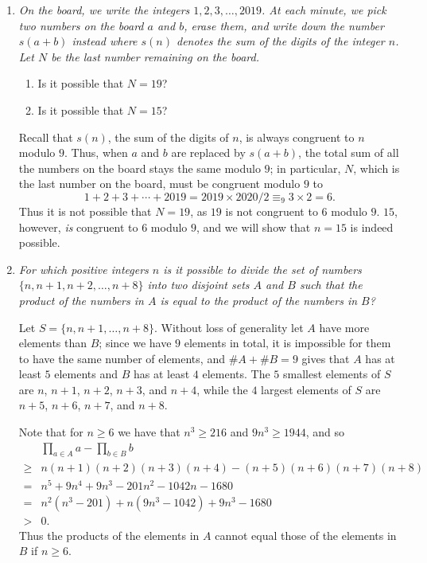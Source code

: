 \documentclass{article}
\begin{document}
\begin{enumerate}

\medskip
\item %
{\itshape On the board, we write the integers $1, 2, 3, \dots, 2019$.
At each minute, we pick two numbers on the board $a$ and $b$, erase them, and write down the number $s(a + b)$ instead where $s(n)$ denotes the sum of the digits of the integer $n$.
Let $N$ be the last number remaining on the board.
\begin{enumerate}
	\item Is it possible that $N = 19$?
	\item Is it possible that $N = 15$?
\end{enumerate}}

Recall that $s(n)$, the sum of the digits of $n$, is always congruent to $n$ modulo $9$.
Thus, when $a$ and $b$ are replaced by $s(a+b)$, the total sum of all the numbers on the board stays the same modulo $9$; in particular, $N$, which is the last number on the board, must be congruent modulo $9$ to
\[ 1 +2 +3 +\dotsb +2019 = 2019 \times 2020 / 2 \equiv_9 3 \times 2 = 6. \]
Thus it is not possible that $N = 19$, as $19$ is not congruent to $6$ modulo $9$.
$15$, however, \emph{is} congruent to $6$ modulo $9$, and we will show that $n = 15$ is indeed possible.



\medskip
\item %
{\itshape For which positive integers $n$ is it possible to divide the set of numbers $\{n, n+1, n+2, \dotsc, n+8\}$ into two disjoint sets $A$ and $B$ such that the product of the numbers in $A$ is equal to the product of the numbers in $B$?}

Let $S = \{n, n+1, \dotsc, n+8\}$.
Without loss of generality let $A$ have more elements than $B$; since we have $9$ elements in total, it is impossible for them to have the same number of elements, and $\#A +\#B = 9$ gives that $A$ has at least $5$ elements and $B$ has at least $4$ elements.
The $5$ smallest elements of $S$ are $n$, $n+1$, $n+2$, $n+3$, and $n+4$, while the $4$ largest elements of $S$ are $n+5$, $n+6$, $n+7$, and $n+8$.

Note that for $n \geq 6$ we have that $n^3 \geq 216$ and $9n^3 \geq 1944$, and so
\begin{align*}
	& \prod_{a \in A} a -\prod_{b \in B} b \\
	\geq & n(n+1)(n+2)(n+3)(n+4) - (n+5)(n+6)(n+7)(n+8) \\
	= & n^5 +9n^4 +9n^3 -201n^2 -1042n -1680 \\
	= & n^2(n^3-201) +n(9n^3-1042) +9n^3-1680 \\
	> & 0.
\end{align*}
Thus the products of the elements in $A$ cannot equal those of the elements in $B$ if $n \geq 6$.


\end{enumerate}
\end{document}
